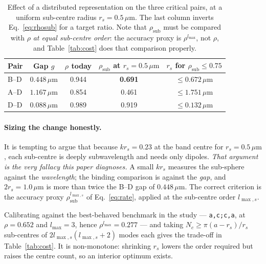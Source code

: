 \documentclass[11pt,a4paper]{article}
\newcommand{\um}{\ensuremath{\,\mu\mathrm{m}}}
\newcommand{\lmax}{\ensuremath{l_{\max}}}
\newcommand{\lmaxs}{\ensuremath{l_{\max,s}}}
\theoremstyle{plain}
\theoremstyle{definition}
\begin{document}
\begin{table}[htbp]
\centering\small
\caption{Effect of a distributed representation on the three critical pairs, at
a uniform sub-centre radius $r_s = 0.5\um$. The last column inverts
Eq.~\eqref{eq:rhosub} for a target ratio. Note that $\rho_{\text{sub}}$ must be
compared with $\rho$ \emph{at equal sub-centre order}: the accuracy proxy is
$\rho^{\lmax}$, not $\rho$, and Table~\ref{tab:cost} does that comparison
properly.}
\label{tab:rhosub}
\begin{tabular}{@{}lcccc@{}}
\toprule
Pair & Gap $g$ & $\rho$ today & $\rho_{\text{sub}}$ at $r_s = 0.5\um$ & $r_s$ for $\rho_{\text{sub}} \le 0.75$ \\
\midrule
B--D & $0.448\um$ & 0.944 & \textcolor{good}{\textbf{0.691}} & $\le 0.672\um$ \\
A--D & $1.167\um$ & 0.854 & \textcolor{good}{0.461} & $\le 1.751\um$ \\
D--D & $0.088\um$ & 0.989 & 0.919 & $\le 0.132\um$ \\
\bottomrule
\end{tabular}
\end{table}

\paragraph{Sizing the change honestly.} It is tempting to argue that because
$k r_s = 0.23$ at the band centre for $r_s = 0.5\um$, each sub-centre is deeply
subwavelength and needs only dipoles. \emph{That argument is the very fallacy
this paper diagnoses.} A small $k r_s$ measures the sub-sphere against the
\emph{wavelength}; the binding comparison is against the \emph{gap}, and
$2 r_s = 1.0\um$ is more than twice the B--D gap of $0.448\um$. The correct
criterion is the accuracy proxy $\rho_{\text{sub}}^{\lmaxs}$ of
Eq.~\eqref{eq:rate}, applied at the sub-centre order $\lmaxs$.

Calibrating against the best-behaved benchmark in the study --- \texttt{a,c;c,a},
at $\rho = 0.652$ and $\lmax = 3$, hence $\rho^{\lmax} = 0.277$ --- and taking
$N_c \ge \pi(a - r_s)/r_s$ sub-centres of $2\lmaxs(\lmaxs + 2)$ modes each
gives the trade-off in Table~\ref{tab:cost}. It is non-monotone: shrinking $r_s$
lowers the order required but raises the centre count, so an interior optimum
exists.
\end{document}
